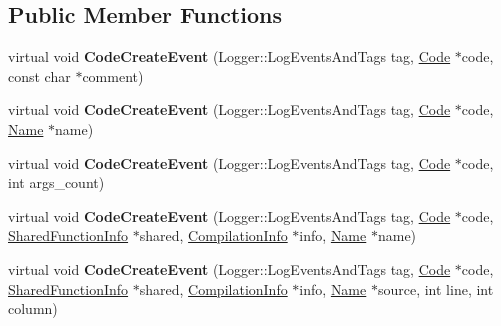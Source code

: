 \subsection*{Public Member Functions}
\begin{DoxyCompactItemize}
\item 
\hypertarget{classv8_1_1internal_1_1_code_event_logger_a3c7de243aec2baed1e5af7281a91f72f}{}virtual void {\bfseries Code\+Create\+Event} (Logger\+::\+Log\+Events\+And\+Tags tag, \hyperlink{classv8_1_1internal_1_1_code}{Code} $\ast$code, const char $\ast$comment)\label{classv8_1_1internal_1_1_code_event_logger_a3c7de243aec2baed1e5af7281a91f72f}

\item 
\hypertarget{classv8_1_1internal_1_1_code_event_logger_a7c0a0ddc7a7ab6f6f36100daa8c590fa}{}virtual void {\bfseries Code\+Create\+Event} (Logger\+::\+Log\+Events\+And\+Tags tag, \hyperlink{classv8_1_1internal_1_1_code}{Code} $\ast$code, \hyperlink{classv8_1_1internal_1_1_name}{Name} $\ast$name)\label{classv8_1_1internal_1_1_code_event_logger_a7c0a0ddc7a7ab6f6f36100daa8c590fa}

\item 
\hypertarget{classv8_1_1internal_1_1_code_event_logger_a060e641ffbce6204ac319f9d66c9a4b7}{}virtual void {\bfseries Code\+Create\+Event} (Logger\+::\+Log\+Events\+And\+Tags tag, \hyperlink{classv8_1_1internal_1_1_code}{Code} $\ast$code, int args\+\_\+count)\label{classv8_1_1internal_1_1_code_event_logger_a060e641ffbce6204ac319f9d66c9a4b7}

\item 
\hypertarget{classv8_1_1internal_1_1_code_event_logger_a93b1334a05efbb0e47921abc6f898af1}{}virtual void {\bfseries Code\+Create\+Event} (Logger\+::\+Log\+Events\+And\+Tags tag, \hyperlink{classv8_1_1internal_1_1_code}{Code} $\ast$code, \hyperlink{classv8_1_1internal_1_1_shared_function_info}{Shared\+Function\+Info} $\ast$shared, \hyperlink{classv8_1_1internal_1_1_compilation_info}{Compilation\+Info} $\ast$info, \hyperlink{classv8_1_1internal_1_1_name}{Name} $\ast$name)\label{classv8_1_1internal_1_1_code_event_logger_a93b1334a05efbb0e47921abc6f898af1}

\item 
\hypertarget{classv8_1_1internal_1_1_code_event_logger_a0862492f930f02a95970ca2aa683488c}{}virtual void {\bfseries Code\+Create\+Event} (Logger\+::\+Log\+Events\+And\+Tags tag, \hyperlink{classv8_1_1internal_1_1_code}{Code} $\ast$code, \hyperlink{classv8_1_1internal_1_1_shared_function_info}{Shared\+Function\+Info} $\ast$shared, \hyperlink{classv8_1_1internal_1_1_compilation_info}{Compilation\+Info} $\ast$info, \hyperlink{classv8_1_1internal_1_1_name}{Name} $\ast$source, int line, int column)\label{classv8_1_1internal_1_1_code_event_logger_a0862492f930f02a95970ca2aa683488c}


\end{DoxyCompactItemize}
